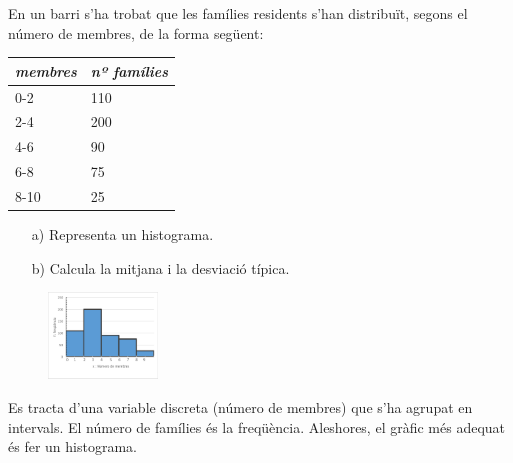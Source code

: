 \begin{resolt}[E]{En un barri s'ha trobat que les famílies residents s'han distribuït, segons el número de membres, de la forma següent:\vspace{0.25cm}
		
	\begin{tabular}{|p{0.7in}|p{0.8in}|} \hline 
		\textbf{\textit{membres}} & \textbf{\textit{nº famílies}} \\ \hline 
		0-2 & 110 \\ \hline 
		2-4 & 200 \\ \hline 
		4-6 & 90 \\ \hline 
		6-8 & 75 \\ \hline 
		8-10 & 25 \\ \hline 
	\end{tabular}
	\vspace{0.25cm}
	
	\begin{itemize}
		\item[a)]  Representa un histograma.
		
		\item[b)]  Calcula la mitjana i la desviació típica.
	\end{itemize}
	}

	\begin{figure} 
	\vspace{-0.75cm}
	\begin{center}
		\includegraphics[width=0.26\textwidth]{img-11/histo1}
	\end{center}
\vspace{-0.5cm}
	\end{figure}

	Es tracta d'una variable discreta (número de membres) que s'ha agrupat en intervals. El número de famílies és la freqüència. Aleshores, el gràfic més adequat és fer un histograma.
	\vspace{0.24cm}
	

\end{resolt}
